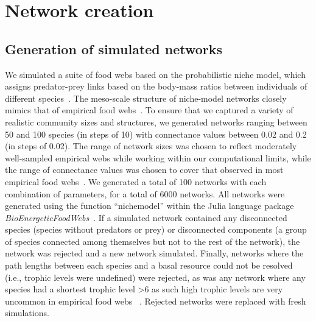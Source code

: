\documentclass[12pt]{article}
\begin{document}
\begin{spacing}{2.0}
{\begin{spacing}{1.0}
\begin{enumerate}
    \end{enumerate}    
\end{spacing}
}
\clearpage

\linenumbers
\section{Network creation}

    \subsection{Generation of simulated networks}

        We simulated a suite of food webs based on the probabilistic niche model, which assigns predator-prey links based on the body-mass ratios between individuals of different species~\citep{Williams2000,Delmas2017}. 
        The meso-scale structure of niche-model networks closely mimics that of empirical food webs~\citep{Stouffer2007}. 
        To ensure that we captured a variety of realistic community sizes and structures, we generated networks ranging between 50 and 100 species (in steps of 10) with connectance values between 0.02 and 0.2 (in steps of 0.02). 
        The range of network sizes was chosen to reflect moderately well-sampled empirical webs while working within our computational limits, while the range of connectance values was chosen to cover that observed in most empirical food webs~\citep{Dunne2002e}.
        We generated a total of 100 networks with each combination of parameters, for a total of 6000 networks. 
        All networks were generated using the function ``nichemodel'' within the Julia language package \emph{BioEnergeticFoodWebs}~\citep{bioenergeticfw,Delmas2017}. 
        If a simulated network contained any disconnected species (species without predators or prey) or disconnected components (a group of species connected among themselves but not to the rest of the network), the network was rejected and a new network simulated.
        Finally, networks where the path lengths between each species and a basal resource could not be resolved (i.e., trophic levels were undefined) were rejected, as was any network where any species had a shortest trophic level \textgreater6 as such high trophic levels are very uncommon in empirical food webs ~\citep{Riede2011}.
        Rejected networks were replaced with fresh simulations.



\end{spacing}
\end{document}
